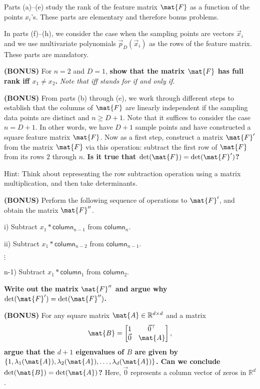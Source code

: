 \documentclass[preview]{standalone}
\begin{document}
Parts (a)--(e) study the rank of the feature matrix $\mat{F}$ as a function of the points $x_i$'s. These parts are elementary and therefore bonus problems.

In parts (f)--(h), we consider the case when the sampling points are vectors $\vec{x}_i$ and we use multivariate polynomials $\vec{p}_D(\vec{x}_i)$ as the rows of the feature matrix. These parts are mandatory.


\begin{Parts}

\Part \textbf{(BONUS)} For $n = 2$ and $D=1$, {\bf show that the matrix $\mat{F}$ has full rank iff $x_1 \neq x_2$.} \emph{Note that iff stands for if and only if.}


\Part \textbf{(BONUS)}
From parts (b) through (e), we work through different steps to establish that the columns of $\mat{F}$ are linearly independent if the sampling data points are distinct and $n \geq D+1$.
Note that it suffices to consider the case $n=D+1$.
In other words, we have $D+1$ sample points and have constructed a square feature matrix $\mat{F}$.
Now as a first step, construct a matrix $\mat{F}'$ from the matrix $\mat{F}$ via this operation: subtract the first row of $\mat{F}$ from its rows $2$ through $n$.
{\bf Is it true that $\det(\mat{F}) = \det(\mat{F}')$?}

Hint: Think about representing the row subtraction operation using a matrix multiplication, and then take determinants.



\Part \textbf{(BONUS)} Perform the following sequence of operations to $\mat{F}'$, and obtain the matrix $\mat{F}''$.

i) Subtract $x_1 * \mathsf{column}_{n-1}$ from $\mathsf{column}_{n}$.

ii) Subtract $x_1 * \mathsf{column}_{n-2}$ from $\mathsf{column}_{n-1}$.

$\vdots$

n-1) Subtract $x_1 * \mathsf{column}_{1}$ from $\mathsf{column}_{2}$.

{\bf Write out the matrix $\mat{F}''$ and argue why $\det(\mat{F}') = \det(\mat{F}'')$.}



\Part \textbf{(BONUS)} For any square matrix $\mat{A} \in \mathbb{R}^{d \times d}$ and a matrix
$$
\mat{B} =
\begin{bmatrix}
1 & {\vec 0}^\top \\
{\vec 0} & \mat{A}
\end{bmatrix},
 $$
{\bf argue that the $d+1$ eigenvalues of $B$ are given by $\{1, \lambda_1(\mat{A} ), \lambda_2(\mat{A} ), \ldots, \lambda_d(\mat{A} )\}$.
Can we conclude $\det(\mat{B}) = \det(\mat{A})$?} Here, ${\vec 0}$ represents a column vector of zeros in $\mathbb{R}^d$.




\end{Parts}
\end{document}

